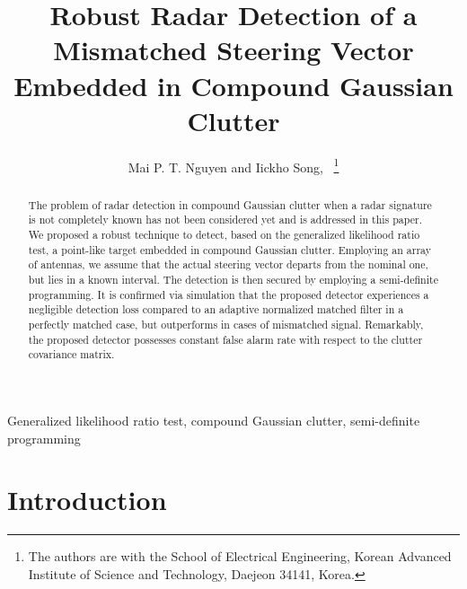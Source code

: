 \documentclass[journal]{IEEEtran}
\begin{document}
\large
%
\title{
Robust Radar Detection of a Mismatched Steering Vector Embedded in Compound Gaussian Clutter
}
\author{Mai P. T. Nguyen and
        Iickho Song,~
        \thanks{The authors are with the School
of Electrical Engineering, Korean Advanced Institute of Science and Technology, Daejeon 34141, Korea.}
}%
\maketitle

\begin{abstract}
The problem of radar detection in compound Gaussian clutter when
a radar signature is not completely known has not been considered yet and
is addressed in this paper.
We proposed a robust technique
to detect, based on the generalized likelihood ratio test, a point-like target 
embedded in compound Gaussian clutter.
Employing an array of antennas, we assume that
the actual steering vector departs from 
the nominal one, but lies in a known interval.
The detection is then secured by employing a semi-deﬁnite
programming.
It is confirmed via simulation that the proposed detector
experiences a negligible detection
loss compared to an adaptive normalized matched filter in a perfectly matched case,
 but outperforms in cases of mismatched signal.
 Remarkably, the proposed detector possesses constant false alarm rate with
respect to the clutter covariance matrix.
\end{abstract}

\begin{IEEEkeywords}
Generalized likelihood ratio test, compound Gaussian clutter, semi-definite programming
\end{IEEEkeywords}

\IEEEpeerreviewmaketitle
\section{Introduction}

\end{document}
